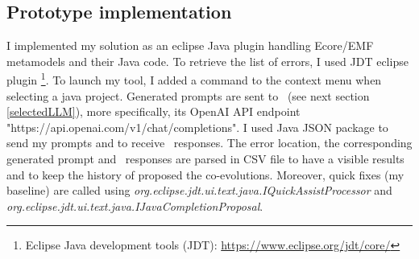\subsection{Prototype implementation}
I implemented my solution as an eclipse Java plugin handling Ecore/EMF metamodels and their Java code. To retrieve the list of errors, I used JDT eclipse plugin \footnote{Eclipse Java development tools (JDT): \url{https://www.eclipse.org/jdt/core/}}. To launch my tool, I added a command to the context menu when selecting a java project. Generated prompts are sent to \LLM~(see next section \ref{selectedLLM}), more specifically, its OpenAI API endpoint "https://api.openai.com/v1/chat/completions". I used Java JSON package to send my prompts and to receive \LLM~responses. The error location, the corresponding generated prompt and \LLM~responses are parsed in CSV file to have a visible results and to keep the history of proposed the co-evolutions.
Moreover, quick fixes (my baseline) are called using 
\textit{org.eclipse.jdt.ui.text.java.IQuickAssistProcessor} and \textit{org.eclipse.jdt.ui.text.java.IJavaCompletionProposal}.


